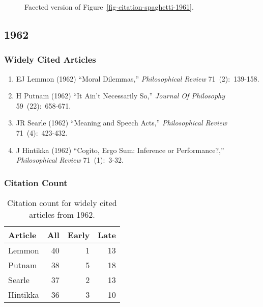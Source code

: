 \documentclass[
  10pt,
  letterpaper,
  DIV=11,
  numbers=noendperiod,
  twoside]{scrartcl}
\providecommand{\tightlist}{%
  \setlength{\itemsep}{0pt}\setlength{\parskip}{0pt}}\usepackage{longtable,booktabs,array}
\begin{document}
\begin{figure}


\caption{\label{fig-citation-facet-1961}Faceted version of
Figure~\ref{fig-citation-spaghetti-1961}.}

\end{figure}%

\newpage

\subsection{1962}\label{sec-s1962}

\subsubsection*{Widely Cited Articles}\label{widely-cited-articles-6}

\begin{enumerate}
\def\labelenumi{\arabic{enumi}.}
\tightlist
\item
  EJ Lemmon (1962) ``Moral Dilemmas,'' \emph{Philosophical Review}
  71~(2):~139-158.
\item
  H Putnam (1962) ``It Ain't Necessarily So,'' \emph{Journal Of
  Philosophy} 59~(22):~658-671.
\item
  JR Searle (1962) ``Meaning and Speech Acts,'' \emph{Philosophical
  Review} 71~(4):~423-432.
\item
  J Hintikka (1962) ``Cogito, Ergo Sum: Inference or Performance?,''
  \emph{Philosophical Review} 71~(1):~3-32.
\end{enumerate}

\subsubsection*{Citation Count}\label{sec-count-1962}

\begin{longtable}[]{@{}lrrr@{}}

\caption{\label{tbl-citation-count-1962}Citation count for widely cited
articles from 1962.}

\tabularnewline

\toprule\noalign{}
Article & All & Early & Late \\
\midrule\noalign{}
\endhead
\bottomrule\noalign{}
\endlastfoot
Lemmon & 40 & 1 & 13 \\
Putnam & 38 & 5 & 18 \\
Searle & 37 & 2 & 13 \\
Hintikka & 36 & 3 & 10 \\

\end{longtable}
\end{document}
